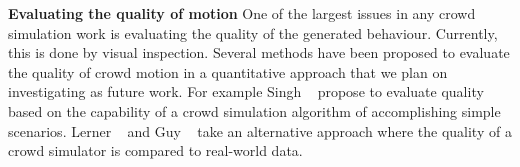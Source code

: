 \textbf{Evaluating the quality of motion}
One of the largest issues in any crowd simulation work is evaluating the quality of the generated behaviour.
Currently, this is done by visual inspection.
Several methods have been proposed to evaluate the quality of crowd motion in a quantitative approach that we plan on investigating as future work.
For example Singh \etal~\cite{Singh2009SteerBench} propose to evaluate quality based on the capability of a crowd simulation algorithm of accomplishing simple scenarios.
Lerner \etal~\cite{Lerner2010Context} and Guy \etal~\cite{Guy2012Statistical} take an alternative approach where the quality of a crowd simulator is compared to real-world data.
